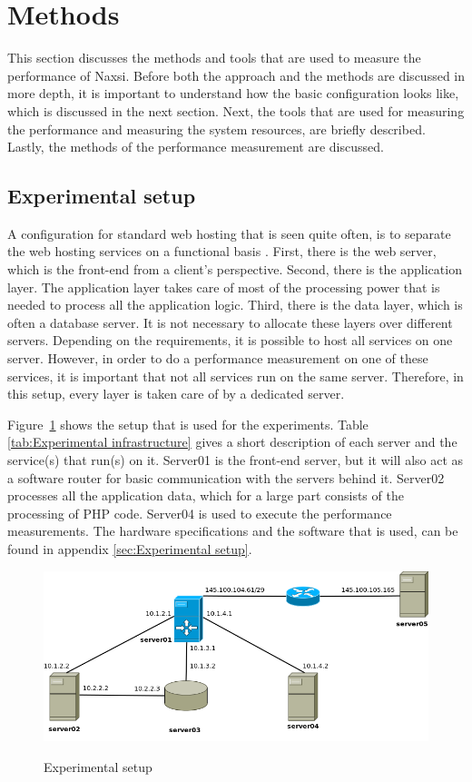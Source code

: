 \documentclass[Methods]{subfiles}
\begin{document}
\section{Methods}
\label{sec:Methods}

This section discusses the methods and tools that are used to measure the performance of Naxsi. Before both the approach and the methods are discussed in more depth, it is important to understand how the basic configuration looks like, which is discussed in the next section. Next, the tools that are used for measuring the performance and measuring the system resources, are briefly described. Lastly, the methods of the performance measurement are discussed.

\subsection{Experimental setup}
A configuration for standard web hosting that is seen quite often, is to separate the web hosting services on a functional basis \cite{Eckerson1995}. First, there is the web server, which is the front-end from a client's perspective. Second, there is the application layer. The application layer takes care of most of the processing power that is needed to process all the application logic. Third, there is the data layer, which is often a database server. It is not necessary to allocate these layers over different servers. Depending on the requirements, it is possible to host all services on one server. However, in order to do a performance measurement on one of these services, it is important that not all services run on the same server. Therefore, in this setup, every layer is taken care of by a dedicated server.

Figure~\ref{fig:Experimental setup} shows the setup that is used for the experiments. Table \ref{tab:Experimental infrastructure} gives a short description of each server and the service(s) that run(s) on it. Server01 is the front-end server, but it will also act as a software router for basic communication with the servers behind it. Server02 processes all the application data, which for a large part consists of the processing of PHP code. Server04 is used to execute the performance measurements. The hardware specifications and the software that is used, can be found in appendix \ref{sec:Experimental setup}.

\begin{figure}[H]
\caption{Experimental setup}
\centering
\includegraphics[scale=0.4] {images/infrastructure.png}
\label{fig:Experimental setup}
\end{figure}
\end{document}
